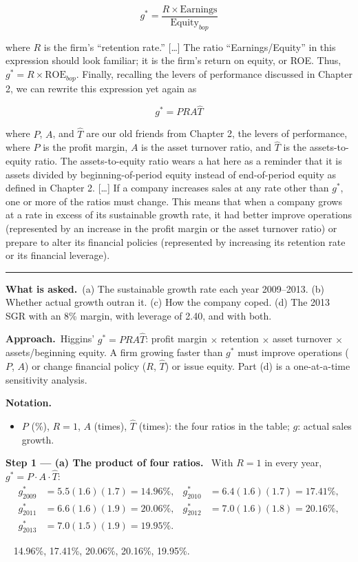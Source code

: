 \documentclass[11pt,a4paper]{article}
\newcommand{\notation}{\par\noindent\textbf{Notation.}}
\newcommand{\step}[2]{\par\medskip\noindent\textbf{Step #1 --- #2.}~}
\newcommand{\asked}{\par\medskip\noindent\textbf{What is asked.}~}
\newcommand{\approach}{\par\smallskip\noindent\textbf{Approach.}~}
\newcommand{\answer}[1]{\par\smallskip\noindent\fbox{\textbf{Answer #1.}}~}
\newcommand{\stmtend}{\par\endgroup\nopagebreak\noindent\rule{\linewidth}{0.4pt}\par\medskip}
\begin{document}
\[g^* = \frac{R \times \text{Earnings}}{\text{Equity}_{bop}}\]

where \(R\) is the firm's ``retention rate.'' {[}\ldots{]} The ratio ``Earnings/Equity'' in this
expression should look familiar; it is the firm's return on equity, or ROE. Thus,
\(g^* = R \times \text{ROE}_{bop}\). Finally, recalling the levers of performance discussed in
Chapter 2, we can rewrite this expression yet again as

\[g^* = PRA\hat T\]

where \(P\), \(A\), and \(\hat T\) are our old friends from Chapter 2, the levers of performance,
where \(P\) is the profit margin, \(A\) is the asset turnover ratio, and \(\hat T\) is the
assets-to-equity ratio. The assets-to-equity ratio wears a hat here as a reminder that it is assets
divided by beginning-of-period equity instead of end-of-period equity as defined in Chapter 2.
{[}\ldots{]} If a company increases sales at any rate other than \(g^*\), one or more of the ratios
must change. This means that when a company grows at a rate in excess of its sustainable growth
rate, it had better improve operations (represented by an increase in the profit margin or the asset
turnover ratio) or prepare to alter its financial policies (represented by increasing its retention
rate or its financial leverage).
\stmtend

\asked (a) The sustainable growth rate each year 2009--2013. (b) Whether actual growth outran it.
(c) How the company coped. (d) The 2013 SGR with an 8\% margin, with leverage of 2.40, and with both.

\approach Higgins' $g^*=PRA\hat T$: profit margin $\times$ retention $\times$ asset turnover $\times$
assets/beginning equity. A firm growing faster than $g^*$ must improve operations ($P$, $A$) or change
financial policy ($R$, $\hat T$) or issue equity. Part (d) is a one-at-a-time sensitivity analysis.

\notation
\begin{itemize}
  \item $P$ (\%), $R=1$, $A$ (times), $\hat T$ (times): the four ratios in the table; $g$: actual sales growth.
\end{itemize}

\step{1}{(a) The product of four ratios} With $R=1$ in every year, $g^*=P\cdot A\cdot\hat T$:
\begin{align}
  g^*_{2009} &= 5.5(1.6)(1.7) = 14.96\%, & g^*_{2010} &= 6.4(1.6)(1.7) = 17.41\%, \nonumber\\
  g^*_{2011} &= 6.6(1.6)(1.9) = 20.06\%, & g^*_{2012} &= 7.0(1.6)(1.8) = 20.16\%, \nonumber\\
  g^*_{2013} &= 7.0(1.5)(1.9) = 19.95\%. & & \label{r2ce10-g}
\end{align}
\answer{(a)} 14.96\%, 17.41\%, 20.06\%, 20.16\%, 19.95\%.
\end{document}
